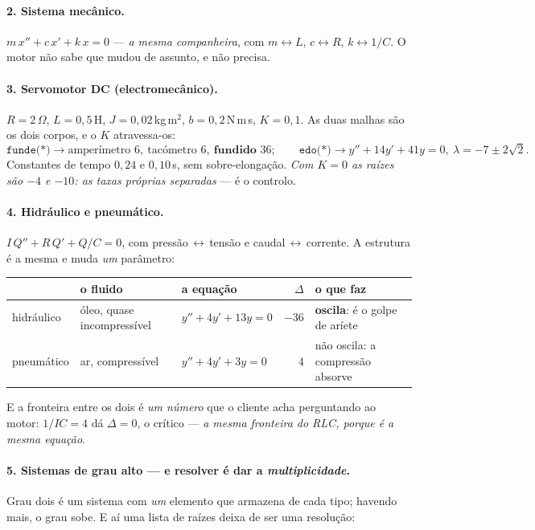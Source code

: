 \documentclass[11pt,a4paper]{article}
\begin{document}
\paragraph{2. Sistema mecânico.} $m\,x''+c\,x'+k\,x=0$ --- \emph{a mesma companheira}, com
$m\leftrightarrow L$, $c\leftrightarrow R$, $k\leftrightarrow 1/C$. O motor não sabe que
mudou de assunto, e não precisa.

\paragraph{3. Servomotor DC (electromecânico).} $R=2\,\Omega$, $L=0{,}5\,$H,
$J=0{,}02\,$kg\,m$^2$, $b=0{,}2\,$N\,m\,s, $K=0{,}1$. As duas malhas são os dois corpos, e o
$K$ atravessa-os:
\[
  \texttt{funde(*)}\to\text{amperímetro }6,\ \text{tacómetro }6,\ \textbf{fundido }36;
  \qquad
  \texttt{edo(*)}\to y''+14y'+41y=0,\ \lambda=-7\pm2\sqrt2 .
\]
Constantes de tempo $0{,}24$ e $0{,}10\,$s, sem sobre-elongação. \emph{Com $K=0$ as raízes
são $-4$ e $-10$: as taxas próprias separadas} --- é o controlo.

\paragraph{4. Hidráulico e pneumático.} $I\,Q''+R\,Q'+Q/C=0$, com pressão\,$\leftrightarrow$\,tensão
e caudal\,$\leftrightarrow$\,corrente. A estrutura é a mesma e muda \emph{um} parâmetro:
\begin{center}\footnotesize
\begin{tabular}{@{}lllrl@{}}
\toprule
& o fluido & a equação & $\Delta$ & o que faz\\
\midrule
hidráulico & óleo, quase incompressível & $y''+4y'+13y=0$ & $-36$ & \textbf{oscila}: é o golpe de aríete\\
pneumático & ar, compressível & $y''+4y'+3y=0$ & $4$ & não oscila: a compressão absorve\\
\bottomrule
\end{tabular}
\end{center}
E a fronteira entre os dois é \emph{um número} que o cliente acha perguntando ao motor:
$1/IC=4$ dá $\Delta=0$, o crítico --- \emph{a mesma fronteira do RLC, porque é a mesma
equação}.

\paragraph{5. Sistemas de grau alto --- e resolver é dar a \emph{multiplicidade}.} Grau dois
é um sistema com \emph{um} elemento que armazena de cada tipo; havendo mais, o grau sobe. E
aí uma lista de raízes deixa de ser uma resolução:
\end{document}
